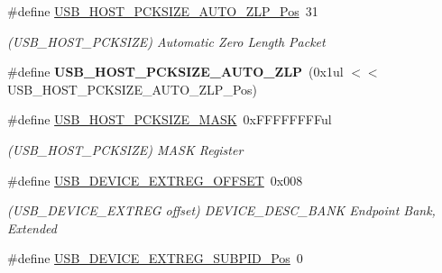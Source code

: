 \begin{DoxyCompactItemize}
\item 
\hypertarget{group___s_a_m_l21___u_s_b_gadef73865672be8097945e8394e51cf70}{}\#define \hyperlink{group___s_a_m_l21___u_s_b_gadef73865672be8097945e8394e51cf70}{U\+S\+B\+\_\+\+H\+O\+S\+T\+\_\+\+P\+C\+K\+S\+I\+Z\+E\+\_\+\+A\+U\+T\+O\+\_\+\+Z\+L\+P\+\_\+\+Pos}~31\label{group___s_a_m_l21___u_s_b_gadef73865672be8097945e8394e51cf70}

\begin{DoxyCompactList}\small\item\em (U\+S\+B\+\_\+\+H\+O\+S\+T\+\_\+\+P\+C\+K\+S\+I\+Z\+E) Automatic Zero Length Packet \end{DoxyCompactList}\item 
\hypertarget{group___s_a_m_l21___u_s_b_ga091978ec15a1bf6ddcdf66204b6f80ce}{}\#define {\bfseries U\+S\+B\+\_\+\+H\+O\+S\+T\+\_\+\+P\+C\+K\+S\+I\+Z\+E\+\_\+\+A\+U\+T\+O\+\_\+\+Z\+L\+P}~(0x1ul $<$$<$ U\+S\+B\+\_\+\+H\+O\+S\+T\+\_\+\+P\+C\+K\+S\+I\+Z\+E\+\_\+\+A\+U\+T\+O\+\_\+\+Z\+L\+P\+\_\+\+Pos)\label{group___s_a_m_l21___u_s_b_ga091978ec15a1bf6ddcdf66204b6f80ce}

\item 
\hypertarget{group___s_a_m_l21___u_s_b_gada5ce5121914a282bb6d155be7a28771}{}\#define \hyperlink{group___s_a_m_l21___u_s_b_gada5ce5121914a282bb6d155be7a28771}{U\+S\+B\+\_\+\+H\+O\+S\+T\+\_\+\+P\+C\+K\+S\+I\+Z\+E\+\_\+\+M\+A\+S\+K}~0x\+F\+F\+F\+F\+F\+F\+F\+Ful\label{group___s_a_m_l21___u_s_b_gada5ce5121914a282bb6d155be7a28771}

\begin{DoxyCompactList}\small\item\em (U\+S\+B\+\_\+\+H\+O\+S\+T\+\_\+\+P\+C\+K\+S\+I\+Z\+E) M\+A\+S\+K Register \end{DoxyCompactList}\item 
\hypertarget{group___s_a_m_l21___u_s_b_ga9ba63c398bf06c6ba1d750e53db76505}{}\#define \hyperlink{group___s_a_m_l21___u_s_b_ga9ba63c398bf06c6ba1d750e53db76505}{U\+S\+B\+\_\+\+D\+E\+V\+I\+C\+E\+\_\+\+E\+X\+T\+R\+E\+G\+\_\+\+O\+F\+F\+S\+E\+T}~0x008\label{group___s_a_m_l21___u_s_b_ga9ba63c398bf06c6ba1d750e53db76505}

\begin{DoxyCompactList}\small\item\em (U\+S\+B\+\_\+\+D\+E\+V\+I\+C\+E\+\_\+\+E\+X\+T\+R\+E\+G offset) D\+E\+V\+I\+C\+E\+\_\+\+D\+E\+S\+C\+\_\+\+B\+A\+N\+K Endpoint Bank, Extended \end{DoxyCompactList}\item 
\hypertarget{group___s_a_m_l21___u_s_b_gaaee8dcd3a757e47151ddd4d36545a469}{}\#define \hyperlink{group___s_a_m_l21___u_s_b_gaaee8dcd3a757e47151ddd4d36545a469}{U\+S\+B\+\_\+\+D\+E\+V\+I\+C\+E\+\_\+\+E\+X\+T\+R\+E\+G\+\_\+\+S\+U\+B\+P\+I\+D\+\_\+\+Pos}~0\label{group___s_a_m_l21___u_s_b_gaaee8dcd3a757e47151ddd4d36545a469}


\end{DoxyCompactItemize}

